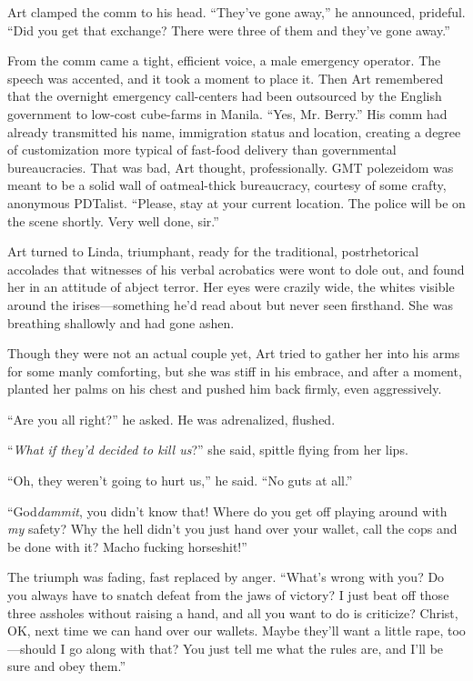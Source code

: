 Art clamped the comm to his head. “They’ve gone away,” he
announced, prideful. “Did you get that exchange? There were three
of them and they’ve gone away.”

From the comm came a tight, efficient voice, a male emergency
operator. The speech was accented, and it took a moment to place
it. Then Art remembered that the overnight emergency call-centers
had been outsourced by the English government to low-cost
cube-farms in Manila. “Yes, Mr. Berry.” His comm had already
transmitted his name, immigration status and location, creating a
degree of customization more typical of fast-food delivery than
governmental bureaucracies. That was bad, Art thought,
professionally. GMT polezeidom was meant to be a solid wall of
oatmeal-thick bureaucracy, courtesy of some crafty, anonymous
PDTalist. “Please, stay at your current location. The police will
be on the scene shortly. Very well done, sir.”

Art turned to Linda, triumphant, ready for the traditional,
postrhetorical accolades that witnesses of his verbal acrobatics
were wont to dole out, and found her in an attitude of abject
terror. Her eyes were crazily wide, the whites visible around the
irises—something he’d read about but never seen firsthand. She was
breathing shallowly and had gone ashen.

Though they were not an actual couple yet, Art tried to gather her
into his arms for some manly comforting, but she was stiff in his
embrace, and after a moment, planted her palms on his chest and
pushed him back firmly, even aggressively.

“Are you all right?” he asked. He was adrenalized, flushed.

“\emph{What if they’d decided to kill us}?” she said, spittle
flying from her lips.

“Oh, they weren’t going to hurt us,” he said. “No guts at all.”

“God\emph{dammit}, you didn’t know that! Where do you get off
playing around with \emph{my} safety? Why the hell didn’t you just
hand over your wallet, call the cops and be done with it? Macho
fucking horseshit!”

The triumph was fading, fast replaced by anger. “What’s wrong with
you? Do you always have to snatch defeat from the jaws of victory?
I just beat off those three assholes without raising a hand, and
all you want to do is criticize? Christ, OK, next time we can hand
over our wallets. Maybe they’ll want a little rape, too—should I go
along with that? You just tell me what the rules are, and I’ll be
sure and obey them.”

